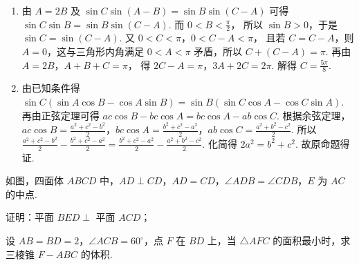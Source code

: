 \begin{solution}
\begin{enumerate}
\item 由 \(A=2B\) 及
\(\sin C\sin\left(A-B\right)=\sin B\sin\left(C-A\right)\)
可得
\(\sin C\sin B=\sin B\sin\left(C-A\right)\).
而
\(0<B<\frac{\pi}{2}\)，
所以 \(\sin B>0\)，于是
\(\sin C=\sin\left(C-A\right)\).
又
\(0<C<\pi\)，\(0<C-A<\pi\)，
且若 \(C=C-A\)，则 \(A=0\)，这与三角形内角满足 \(0<A<\pi\) 矛盾，所以
\(C+\left(C-A\right)=\pi\).
再由
\(A=2B\)，\(A+B+C=\pi\)，
得
\(2C-A=\pi\)，\(3A+2C=2\pi\).
解得
\(C=\frac{5\pi}{8}\).

\item 由已知条件得
\(\sin C\left(\sin A\cos B-\cos A\sin B\right)=\sin B\left(\sin C\cos A-\cos C\sin A\right)\).
再由正弦定理可得
\(ac\cos B-bc\cos A=bc\cos A-ab\cos C\).
根据余弦定理，\(ac\cos B=\frac{a^2+c^2-b^2}{2}\)，\(bc\cos A=\frac{b^2+c^2-a^2}{2}\)，\(ab\cos C=\frac{a^2+b^2-c^2}{2}\). 所以 \(\frac{a^2+c^2-b^2}{2}-\frac{b^2+c^2-a^2}{2}=\frac{b^2+c^2-a^2}{2}-\frac{a^2+b^2-c^2}{2}\).
化简得
\(2a^2=b^2+c^2\).
故原命题得证.
\end{enumerate}
\end{solution}

\begin{problem}
如图，四面体 \(ABCD\) 中，\(AD\perp CD\)，\(AD=CD\)，\(\angle ADB=\angle CDB\)，\(E\) 为 \(AC\) 的中点.

\begin{center}
\end{center}

 证明：平面 \(BED\perp\) 平面 \(ACD\)；

 设 \(AB=BD=2\)，\(\angle ACB=60^\circ\)，点 \(F\) 在 \(BD\) 上，当 \(\triangle AFC\) 的面积最小时，求三棱锥 \(F-ABC\) 的体积.
\end{problem}

